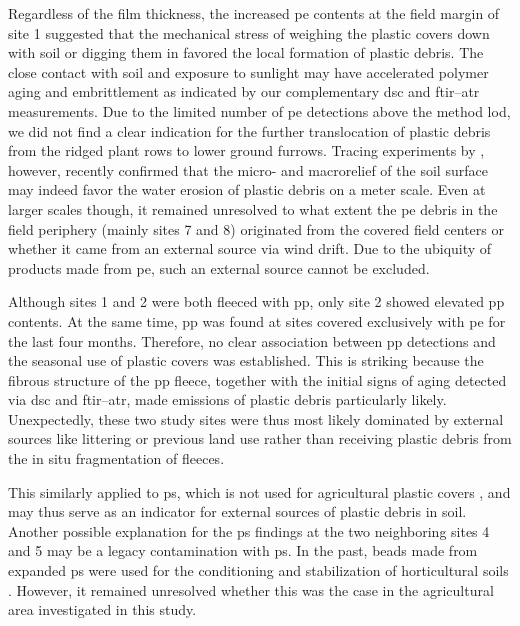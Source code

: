 Regardless of the film thickness, the increased \ac{pe} contents at the field margin of site 1 suggested that the mechanical stress of weighing the plastic covers down with soil or digging them in favored the local formation of plastic debris. The close contact with soil and exposure to sunlight may have accelerated polymer aging and embrittlement as indicated by our complementary \ac{dsc} and \ac{ftir}--\ac{atr} measurements.
Due to the limited number of \ac{pe} detections above the method \ac{lod}, we did not find a clear indication for the further translocation of plastic debris from the ridged plant rows to lower ground furrows. Tracing experiments by \citet{LaermannsTracing2021}, however, recently confirmed that the micro- and macrorelief of the soil surface may indeed favor the water erosion of plastic debris on a meter scale.
Even at larger scales though, it remained unresolved to what extent the \ac{pe} debris in the field periphery (mainly sites 7 and 8) originated from the covered field centers or whether it came from an external source via wind drift. Due to the ubiquity of products made from \ac{pe}, such an external source cannot be excluded.

Although sites 1 and 2 were both fleeced with \ac{pp}, only site 2 showed elevated \ac{pp} contents. At the same time, \ac{pp} was found at sites covered exclusively with \ac{pe} for the last four months. Therefore, no clear association between \ac{pp} detections and the seasonal use of plastic covers was established. This is striking because the fibrous structure of the \ac{pp} fleece, together with the initial signs of aging detected via \ac{dsc} and \ac{ftir}--\ac{atr}, made emissions of plastic debris particularly likely.
Unexpectedly, these two study sites were thus most likely dominated by external sources like littering or previous land use rather than receiving plastic debris from the in situ fragmentation of fleeces.

This similarly applied to \ac{ps}, which is not used for agricultural plastic covers \citep{BertlingKunststoffe2021}, and may thus serve as an indicator for external sources of plastic debris in soil. Another possible explanation for the \ac{ps} findings at the two neighboring sites 4 and 5 may be a legacy contamination with \ac{ps}. In the past, beads made from expanded \ac{ps} were used for the conditioning and stabilization of horticultural soils \citep{MaghchicheUse2010}. However, it remained unresolved whether this was the case in the agricultural area investigated in this study.

